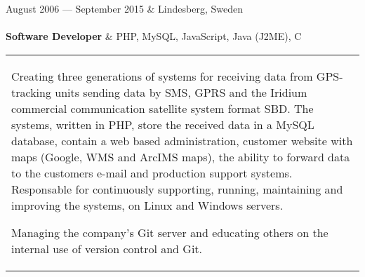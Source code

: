 \documentclass{cv-stylish}
\begin{document}
\begin{center}
\begin{JobTable}
  August 2006 --- September 2015 & \hfill Lindesberg, Sweden \\[3pt]
   \\[3pt]
  \hspace{5mm} \textbf{Software Developer} & \hfill PHP, MySQL,
  JavaScript, Java (J2ME), C \\
\end{JobTable}
\begin{tabularx}{0.97\linewidth}{X}
\begin{compactitem}
  \item Creating three generations of systems for receiving data from
    GPS-tracking units sending data by SMS, GPRS and the Iridium
    commercial communication satellite system format SBD.
    The systems, written in PHP, store the received data in a MySQL
    database, contain a web based administration, customer website
    with maps (Google, WMS and ArcIMS maps), the ability to forward
    data to the customers e-mail and production support
    systems. Responsable for continuously supporting, running,
    maintaining and improving the systems, on Linux and Windows
    servers.
  \item Managing the company's Git server and educating others on the
    internal use of version control and Git.
\end{compactitem}
\end{tabularx}





\end{center}
\end{document}
